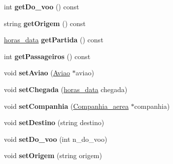\begin{DoxyCompactItemize}
\item 
\hypertarget{class_plano__de__voo_a9c0dfce3f44bc6b98115a44c0e104420}{
int {\bfseries getDo\_\-voo} () const }
\label{class_plano__de__voo_a9c0dfce3f44bc6b98115a44c0e104420}

\item 
\hypertarget{class_plano__de__voo_a844c94ad991869e424a99af1d38d800f}{
string {\bfseries getOrigem} () const }
\label{class_plano__de__voo_a844c94ad991869e424a99af1d38d800f}

\item 
\hypertarget{class_plano__de__voo_a33a28d4e35b0e28e477a865f8b95ceaf}{
\hyperlink{structhoras__data}{horas\_\-data} {\bfseries getPartida} () const }
\label{class_plano__de__voo_a33a28d4e35b0e28e477a865f8b95ceaf}

\item 
\hypertarget{class_plano__de__voo_ad8f551d426c3257f6f286656aa9a9f85}{
int {\bfseries getPassageiros} () const }
\label{class_plano__de__voo_ad8f551d426c3257f6f286656aa9a9f85}

\item 
\hypertarget{class_plano__de__voo_ac17117cb9b0f38b749adb21c65f67599}{
void {\bfseries setAviao} (\hyperlink{class_aviao}{Aviao} $\ast$aviao)}
\label{class_plano__de__voo_ac17117cb9b0f38b749adb21c65f67599}

\item 
\hypertarget{class_plano__de__voo_a7bfdcaa07f2055be99a27b7c3bdbdcd4}{
void {\bfseries setChegada} (\hyperlink{structhoras__data}{horas\_\-data} chegada)}
\label{class_plano__de__voo_a7bfdcaa07f2055be99a27b7c3bdbdcd4}

\item 
\hypertarget{class_plano__de__voo_a8187d1110139c3c3c220916cbfcf4b19}{
void {\bfseries setCompanhia} (\hyperlink{class_companhia__aerea}{Companhia\_\-aerea} $\ast$companhia)}
\label{class_plano__de__voo_a8187d1110139c3c3c220916cbfcf4b19}

\item 
\hypertarget{class_plano__de__voo_a72bdfd06ccd26f364ab157eb05167d38}{
void {\bfseries setDestino} (string destino)}
\label{class_plano__de__voo_a72bdfd06ccd26f364ab157eb05167d38}

\item 
\hypertarget{class_plano__de__voo_ac3d77fa458ed05e7f18d2a27ec93c237}{
void {\bfseries setDo\_\-voo} (int n\_\-do\_\-voo)}
\label{class_plano__de__voo_ac3d77fa458ed05e7f18d2a27ec93c237}

\item 
\hypertarget{class_plano__de__voo_af451a26eb6f819620ee9a43e582c0272}{
void {\bfseries setOrigem} (string origem)}
\label{class_plano__de__voo_af451a26eb6f819620ee9a43e582c0272}


\end{DoxyCompactItemize}
